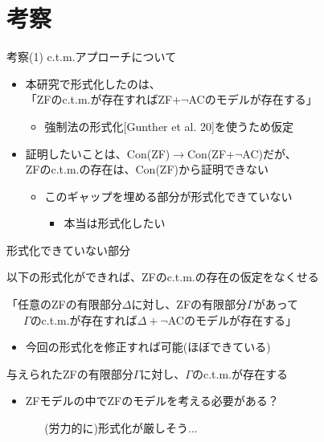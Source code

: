 \documentclass[17pt,aspectratio=169]{beamer}
\begin{document}
\section {考察}

\begin{frame}{考察(1) {\normalsize c.t.m.アプローチについて}}
    \vspace{-30pt}
    \,{\small 
    \begin{itemize}
        \item 本研究で形式化したのは、\\
              「ZFのc.t.m.が存在すればZF+$\neg$ACのモデルが存在する」
              \begin{itemize}
                \item 強制法の形式化[Gunther et al. 20]を使うため仮定
              \end{itemize}
        \item 証明したいことは、Con(ZF)$\rightarrow$Con(ZF+$\neg$AC)だが、\\
              ZFのc.t.m.の存在は、Con(ZF)から証明できない
              \begin{itemize} 
                \item このギャップを埋める部分が形式化できていない
                \begin{itemize}
                    \item 本当は形式化したい
                \end{itemize}
              \end{itemize}
    \end{itemize}
    }
\end{frame}

\begin{frame}{形式化できていない部分}
    \,
    {\small 
        以下の形式化ができれば、ZFのc.t.m.の存在の仮定をなくせる

        \textbullet「任意のZFの有限部分$\Delta$に対し、ZFの有限部分$\Gamma$があって\\
                  \,\,\,\,\,\,\,\,\,$\Gamma$のc.t.m.が存在すれば$\Delta + \neg$ACのモデルが存在する」
                  \vspace{-5pt}
                  \begin{itemize}[left=1.5cm]
                    \item [\textasteriskcentered] 今回の形式化を修正すれば可能(ほぼできている)
                  \end{itemize}
        \textbullet 与えられたZFの有限部分$\Gamma$に対し、$\Gamma$のc.t.m.が存在する
                  \vspace{-5pt}
                  \begin{itemize}[itemsep=5pt,left=1.5cm]
                    \item [\textasteriskcentered] ZFモデルの中でZFのモデルを考える必要がある？
                    
                    \,\,\,\,\,\,\,\,\textendash \,\,(労力的に)形式化が厳しそう...
                  \end{itemize}
    }
\end{frame}
\end{document}
